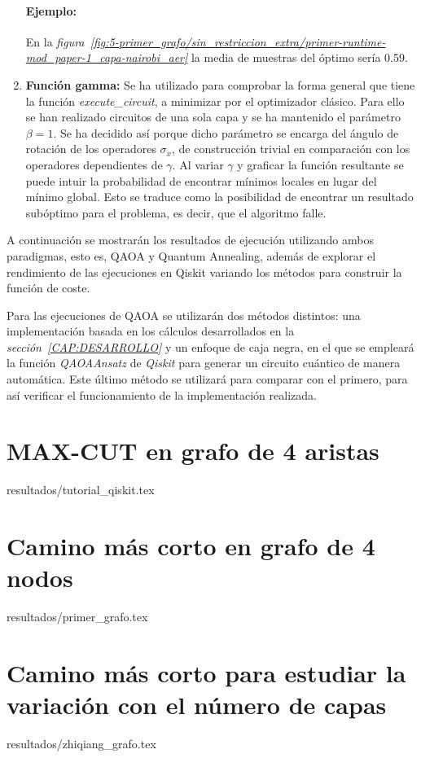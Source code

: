 \begin{enumerate}
  \paragraph{Ejemplo:}
  En la \textit{figura~\ref{fig:5-primer_grafo/sin_restriccion_extra/primer-runtime-mod_paper-1_capa-nairobi_aer}} la media de muestras del óptimo sería 0.59.
  
\item \textbf{Función gamma:}
  Se ha utilizado para comprobar la forma general que tiene la función \textit{execute\_circuit}, a minimizar por el optimizador clásico.
  Para ello se han realizado circuitos de una sola capa y se ha mantenido el parámetro \(\beta=1\).
  Se ha decidido así porque dicho parámetro se encarga del ángulo de rotación de los operadores \(\sigma_{x}\), de construcción trivial en comparación con los operadores dependientes de \(\gamma\).
  Al variar \(\gamma\) y graficar la función resultante se puede intuir la probabilidad de encontrar mínimos locales en lugar del mínimo global.
  Esto se traduce como la posibilidad de encontrar un resultado subóptimo para el problema, es decir, que el algoritmo falle.
\end{enumerate}

A continuación se mostrarán los resultados de ejecución utilizando ambos paradigmas, esto es, QAOA y Quantum Annealing, además de explorar el rendimiento de las ejecuciones en Qiskit variando los métodos para construir la función de coste.

Para las ejecuciones de QAOA se utilizarán dos métodos distintos:
una implementación basada en los cálculos desarrollados en la \textit{sección~\ref{CAP:DESARROLLO}} y un enfoque de caja negra, en el que se empleará la función \textit{QAOAAnsatz} de \textit{Qiskit} para generar un circuito cuántico de manera automática.
Este último método se utilizará para comparar con el primero, para así verificar el funcionamiento de la implementación realizada.

\section{MAX-CUT en grafo de 4 aristas}{resultados/tutorial_qiskit.tex}

\section{Camino más corto en grafo de 4 nodos\label{sec:5-primer_grafo}}{resultados/primer_grafo.tex}

\section{Camino más corto para estudiar la variación con el número de capas}{resultados/zhiqiang_grafo.tex}

